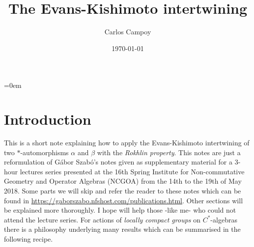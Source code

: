 \documentclass[11pt,a4paper,oneside]{amsart}
\begin{document}
\title{The Evans-Kishimoto intertwining}

\thispagestyle{fancy}



\author{Carlos Campoy}



\date{\today}


\maketitle


\parskip=0em

\setlength{\parindent}{0cm} \setlength{\parskip}{0.5cm}


\maketitle

\section{Introduction}

This is a short note explaining how to apply the Evans-Kishimoto intertwining of two $*$-automorphisms $\alpha$ and $\beta$ with the \textit{Rokhlin property}. This notes are just a reformulation of Gábor Szabó's notes given as supplementary material for a 3-hour lectures series presented at the 16th Spring Institute for Non-commutative Geometry and Operator Algebras (NCGOA) from the 14th to the 19th of May 2018. Some parts we will skip and refer the reader to these notes which can be found in  \href{https://gaborszabo.nfshost.com/publications.html}{https://gaborszabo.nfshost.com/publications.html}. Other sections will be explained more thoroughly. I hope will help those -like me- who could not attend the lecture series. For actions of \textit{locally compact groups} on $C^*$-algebras there is a philosophy underlying many results which can be summarised in the following recipe.
\end{document}
